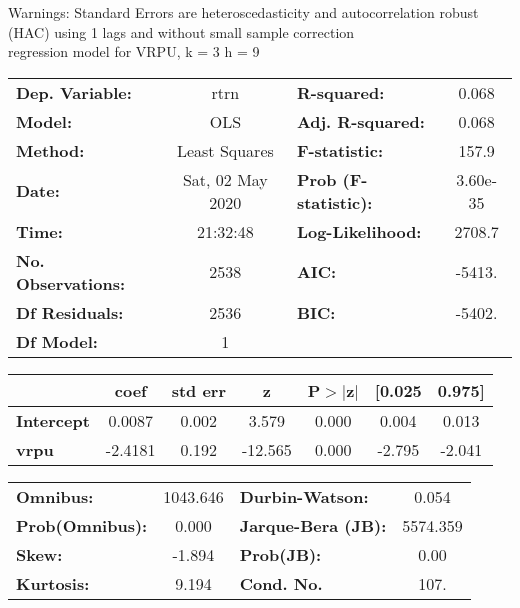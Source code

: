 Warnings: \newline
 [1] Standard Errors are heteroscedasticity and autocorrelation robust (HAC) using 1 lags and without small sample correction\\ 

regression model for VRPU, k = 3 h = 9\begin{center}
\begin{tabular}{lclc}
\toprule
\textbf{Dep. Variable:}    &       rtrn       & \textbf{  R-squared:         } &     0.068   \\
\textbf{Model:}            &       OLS        & \textbf{  Adj. R-squared:    } &     0.068   \\
\textbf{Method:}           &  Least Squares   & \textbf{  F-statistic:       } &     157.9   \\
\textbf{Date:}             & Sat, 02 May 2020 & \textbf{  Prob (F-statistic):} &  3.60e-35   \\
\textbf{Time:}             &     21:32:48     & \textbf{  Log-Likelihood:    } &    2708.7   \\
\textbf{No. Observations:} &        2538      & \textbf{  AIC:               } &    -5413.   \\
\textbf{Df Residuals:}     &        2536      & \textbf{  BIC:               } &    -5402.   \\
\textbf{Df Model:}         &           1      & \textbf{                     } &             \\
\bottomrule
\end{tabular}
\begin{tabular}{lcccccc}
                   & \textbf{coef} & \textbf{std err} & \textbf{z} & \textbf{P$> |$z$|$} & \textbf{[0.025} & \textbf{0.975]}  \\
\midrule
\textbf{Intercept} &       0.0087  &        0.002     &     3.579  &         0.000        &        0.004    &        0.013     \\
\textbf{vrpu}      &      -2.4181  &        0.192     &   -12.565  &         0.000        &       -2.795    &       -2.041     \\
\bottomrule
\end{tabular}
\begin{tabular}{lclc}
\textbf{Omnibus:}       & 1043.646 & \textbf{  Durbin-Watson:     } &    0.054  \\
\textbf{Prob(Omnibus):} &   0.000  & \textbf{  Jarque-Bera (JB):  } & 5574.359  \\
\textbf{Skew:}          &  -1.894  & \textbf{  Prob(JB):          } &     0.00  \\
\textbf{Kurtosis:}      &   9.194  & \textbf{  Cond. No.          } &     107.  \\
\bottomrule
\end{tabular}
\end{center}

